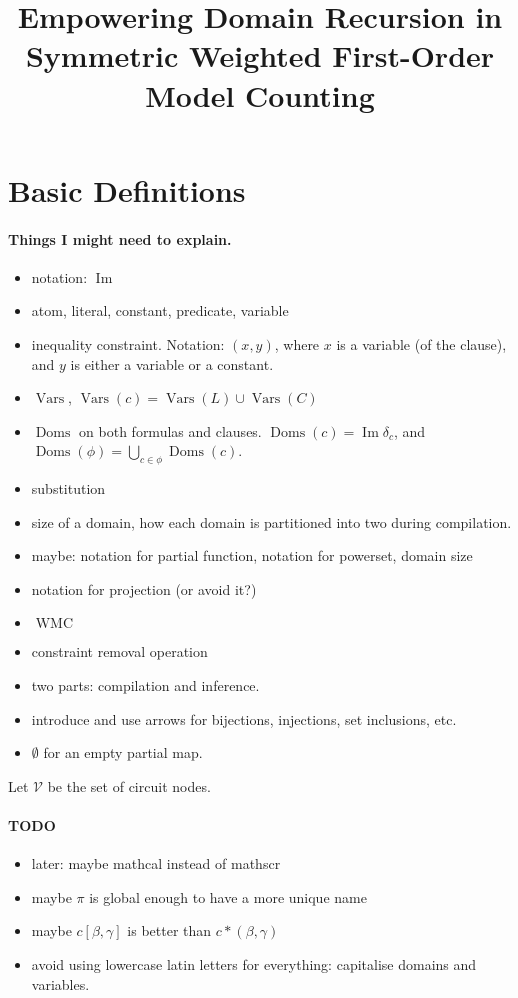 \documentclass{article}
\title{Empowering Domain Recursion in Symmetric Weighted First-Order Model Counting}
\theoremstyle{definition}
\DeclareMathOperator{\Imm}{Im}
\DeclareMathOperator{\Doms}{Doms}
\DeclareMathOperator{\Vars}{Vars}
\DeclareMathOperator{\WMC}{WMC}
\begin{document}
\maketitle

\section{Basic Definitions}

\paragraph{Things I might need to explain.}
\begin{itemize}
\item notation: $\Imm$
\item atom, literal, constant, predicate, variable
\item inequality constraint. Notation: $(x, y)$, where $x$ is a variable (of the clause), and $y$ is either a variable or a constant.
\item $\Vars$, $\Vars(c) = \Vars(L) \cup \Vars(C)$
\item $\Doms$ on both formulas and clauses. $\Doms(c) = \Imm \delta_c$, and $\Doms(\phi) = \bigcup_{c \in \phi} \Doms(c)$.
\item substitution
\item size of a domain, how each domain is partitioned into two during compilation.
\item maybe: notation for partial function, notation for powerset, domain size
\item notation for projection (or avoid it?)
\item $\WMC$
\item constraint removal operation
\item two parts: compilation and inference.
\item introduce and use arrows for bijections, injections, set inclusions, etc.
\item $\emptyset$ for an empty partial map.
\end{itemize}

Let $\mathscr{V}$ be the set of circuit nodes.

\paragraph{TODO}
\begin{itemize}
\item later: maybe mathcal instead of mathscr
\item maybe $\pi$ is global enough to have a more unique name
\item maybe $c[\beta, \gamma]$ is better than $c \ast (\beta, \gamma)$
\item avoid using lowercase latin letters for everything: capitalise domains and variables.
\end{itemize}
\end{document}
